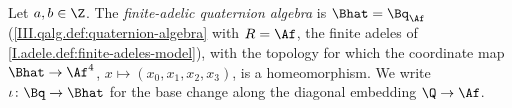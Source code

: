 Let $a,b\in\Z$. The \emph{finite-adelic quaternion algebra} is $\Bhat=\Bq_{\Af}$ (\cref{III.qalg.def:quaternion-algebra} with $R=\Af$,
the finite adeles of \cref{I.adele.def:finite-adeles-model}), with the topology for which the coordinate map $\Bhat\to\Af^4$,
$x\mapsto(x_0,x_1,x_2,x_3)$, is a homeomorphism. We write $\iota\colon\Bq\to\Bhat$ for the base change along the diagonal embedding $\Q\to\Af$.

